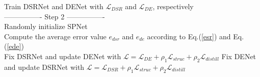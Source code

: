 \documentclass{vip-theme}
\begin{document}
\begin{sloppypar}
\begin{algorithm}[H]
        {
         Train DSRNet and DENet with $\mathcal{L}_{DSR}$ and $\mathcal{L}_{DE}$, respectively\\
         }
         ---------------- Step 2 ----------------\\
         Randomly initialize SPNet\\
         {
         Compute the average error value $e_{dsr}$ and $e_{de}$ according to Eq.(\ref{esr}) and Eq.(\ref{ede})\\
         {
        Fix DSRNet and update DENet with $\mathcal{L} = \mathcal{L}_{DE} + \rho_1\mathcal{L}_{struc} + \rho_2\mathcal{L}_{distill}$
        }
        \Else
        {
        Fix  DENet and update DSRNet with $\mathcal{L} = \mathcal{L}_{DSR} + \rho_1\mathcal{L}_{struc} + \rho_2\mathcal{L}_{distill}$
         }
         }
  
    \end{algorithm}

%		
%			


\end{sloppypar}
\end{document}
